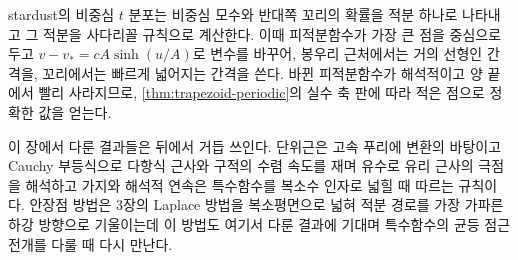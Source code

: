 \begin{instardust}
stardust의 비중심 $t$ 분포는 비중심 모수와 반대쪽 꼬리의 확률을 적분 하나로 나타내고 그 적분을 사다리꼴 규칙으로 계산한다. 이때 피적분함수가 가장 큰 점을 중심으로 두고 $v-v_*=cA\sinh(u/A)$로 변수를 바꾸어, 봉우리 근처에서는 거의 선형인 간격을, 꼬리에서는 빠르게 넓어지는 간격을 쓴다. 바뀐 피적분함수가 해석적이고 양 끝에서 빨리 사라지므로, \cref{thm:trapezoid-periodic}의 실수 축 판에 따라 적은 점으로 정확한 값을 얻는다.
\end{instardust}

이 장에서 다룬 결과들은 뒤에서 거듭 쓰인다. 단위근은 고속 푸리에 변환의 바탕이고 Cauchy 부등식으로 다항식 근사와 구적의 수렴 속도를 재며 유수로 유리 근사의 극점을 해석하고 가지와 해석적 연속은 특수함수를 복소수 인자로 넓힐 때 따르는 규칙이다. 안장점 방법은 3장의 Laplace 방법을 복소평면으로 넓혀 적분 경로를 가장 가파른 하강 방향으로 기울이는데 이 방법도 여기서 다룬 결과에 기대며 특수함수의 균등 점근 전개를 다룰 때 다시 만난다.

\chapterreferences
